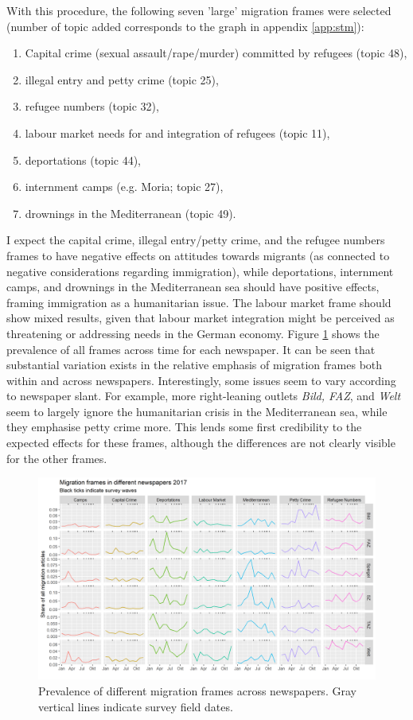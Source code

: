 \documentclass{article}
\begin{document}
With this procedure, the following seven 'large' migration frames were selected (number of topic added corresponds to the graph in appendix \ref{app:stm}):

\begin{enumerate}
    \item Capital crime (sexual assault/rape/murder) committed by refugees (topic 48), 
    \item illegal entry and petty crime (topic 25),
    \item refugee numbers (topic 32),
    \item labour market needs for and integration of refugees (topic 11),
    \item deportations (topic 44),
    \item internment camps (e.g. Moria; topic 27),
    \item drownings in the Mediterranean (topic 49).
\end{enumerate}

I expect the capital crime, illegal entry/petty crime, and the refugee numbers frames to have negative effects on attitudes towards migrants (as connected to negative considerations regarding immigration), while deportations, internment camps, and drownings in the Mediterranean sea should have positive effects, framing immigration as a humanitarian issue. The labour market frame should show mixed results, given that labour market integration might be perceived as threatening or addressing needs in the German economy. Figure \ref{fig:frames} shows the prevalence of all frames across time for each newspaper. It can be seen that substantial variation exists in the relative emphasis of migration frames both within and across newspapers. Interestingly, some issues seem to vary according to newspaper slant. For example, more right-leaning outlets \textit{Bild, FAZ}, and \textit{Welt} seem to largely ignore the humanitarian crisis in the Mediterranean sea, while they emphasise petty crime more. This lends some first credibility to the expected effects for these frames, although the differences are not clearly visible for the other frames.

\begin{figure}[!ht]
    \centering
    \includegraphics[width=\textwidth]{paper/vis/frames_papers_focus.png}
    \caption{Prevalence of different migration frames across newspapers. Gray vertical lines indicate survey field dates.}
    \label{fig:frames}
\end{figure}
\end{document}
